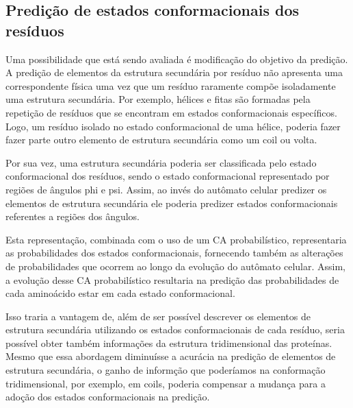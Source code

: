 

\subsection{Predição de estados conformacionais dos resíduos}

Uma possibilidade que está sendo avaliada é modificação do objetivo da predição. A predição de elementos da estrutura secundária por resíduo não apresenta uma correspondente física uma vez que um resíduo raramente compõe isoladamente uma estrutura secundária. Por exemplo, hélices e fitas são formadas pela repetição de resíduos que se encontram em estados conformacionais específicos. Logo, um resíduo isolado no estado conformacional de uma hélice, poderia fazer fazer parte outro elemento de estrutura secundária como um coil ou volta.

Por sua vez, uma estrutura secundária poderia ser classificada pelo estado conformacional dos resíduos, sendo o estado conformacional representado por regiões de ângulos phi e psi. Assim, ao invés do autômato celular predizer os elementos de estrutura secundária ele poderia predizer estados conformacionais referentes a regiões dos ângulos. 

Esta representação, combinada com o uso de um CA probabilístico, representaria as probabilidades dos estados conformacionais, fornecendo também as alterações de probabilidades que ocorrem ao longo da evolução do autômato celular. Assim, a evolução desse CA probabilístico resultaria na predição das probabilidades de cada aminoácido estar em cada estado conformacional.

Isso traria a vantagem de, além de ser possível descrever os elementos de estrutura secundária utilizando os estados conformacionais de cada resíduo, seria possível obter também informações da estrutura tridimensional das proteínas. Mesmo que essa abordagem diminuísse a acurácia na predição de elementos de estrutura secundária, o ganho de informção que poderíamos na conformação tridimensional, por exemplo, em coils, poderia compensar a mudança para a adoção dos estados conformacionais na predição.

